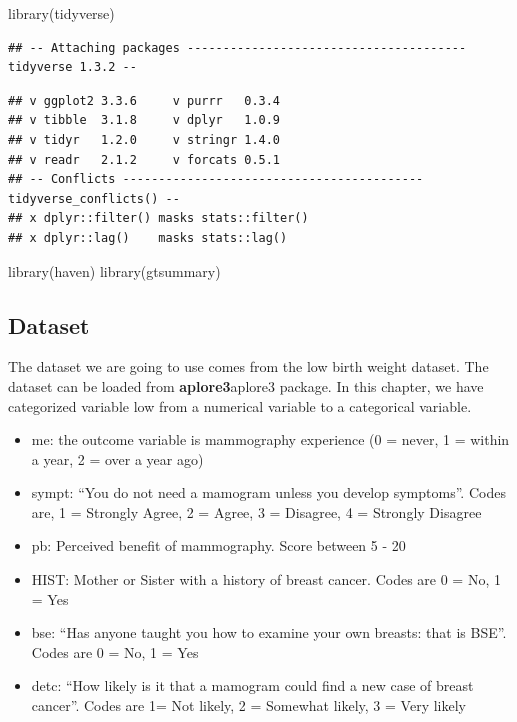 \documentclass[
  10pt,
]{krantz}
\newenvironment{Shaded}{\begin{snugshade}}{\end{snugshade}}
\newcommand{\FunctionTok}[1]{\textcolor[rgb]{0.00,0.00,0.00}{#1}}
\newcommand{\NormalTok}[1]{#1}
\providecommand{\tightlist}{%
  \setlength{\itemsep}{0pt}\setlength{\parskip}{0pt}}
\begin{document}
\begin{Shaded}
\begin{Highlighting}[]
\FunctionTok{library}\NormalTok{(tidyverse)}
\end{Highlighting}
\end{Shaded}

\begin{verbatim}
## -- Attaching packages --------------------------------------- tidyverse 1.3.2 --
\end{verbatim}

\begin{verbatim}
## v ggplot2 3.3.6     v purrr   0.3.4
## v tibble  3.1.8     v dplyr   1.0.9
## v tidyr   1.2.0     v stringr 1.4.0
## v readr   2.1.2     v forcats 0.5.1
## -- Conflicts ------------------------------------------ tidyverse_conflicts() --
## x dplyr::filter() masks stats::filter()
## x dplyr::lag()    masks stats::lag()
\end{verbatim}

\begin{Shaded}
\begin{Highlighting}[]
\FunctionTok{library}\NormalTok{(haven)}
\FunctionTok{library}\NormalTok{(gtsummary)}
\end{Highlighting}
\end{Shaded}

\hypertarget{dataset-2}{%
\subsection{Dataset}\label{dataset-2}}

The dataset we are going to use comes from the low birth weight dataset. The dataset can be loaded from \textbf{aplore3}aplore3 package. In this chapter, we have categorized variable low from a numerical variable to a categorical variable.

\begin{itemize}
\tightlist
\item
  me: the outcome variable is mammography experience (0 = never, 1 = within a year, 2 = over a year ago)
\item
  sympt: ``You do not need a mamogram unless you develop symptoms''. Codes are, 1 = Strongly Agree, 2 = Agree, 3 = Disagree, 4 = Strongly Disagree
\item
  pb: Perceived benefit of mammography. Score between 5 - 20
\item
  HIST: Mother or Sister with a history of breast cancer. Codes are 0 = No, 1 = Yes
\item
  bse: ``Has anyone taught you how to examine your own breasts: that is BSE''. Codes are 0 = No, 1 = Yes
\item
  detc: ``How likely is it that a mamogram could find a new case of breast cancer''. Codes are 1= Not likely, 2 = Somewhat likely, 3 = Very likely
\end{itemize}
\end{document}
